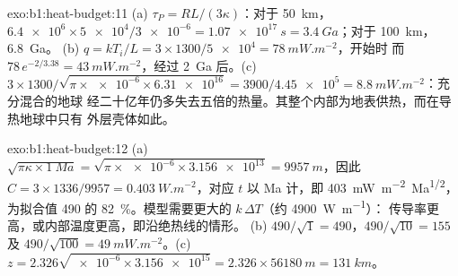 \begin{solution}{exo:b1:heat-budget:11}
(a) $\tau_P = RL/(3\kappa)$：对于 \qty{50}{km}，$\num{6.4e6}\times\num{5e4}/\num{3e-6}
= \qty{1.07e17}{s} = \qty{3.4}{Ga}$；对于 \qty{100}{km}，\qty{6.8}{Ga}。
(b) $q = kT_i/L = 3\times1300/\num{5e4} = \qty{78}{mW.m^{-2}}$，开始时
而 $78\,e^{-2/3.38} = \qty{43}{mW.m^{-2}}$，经过 \qty{2}{Ga} 后。(c)
$3\times1300/\sqrt{\pi\times\num{e-6}\times\num{6.31e16}} = 3900/\num{4.45e5} =
\qty{8.8}{mW.m^{-2}}$：充分混合的地球
经二十亿年仍多失去五倍的热量。其整个内部为地表供热，而在导热地球中只有
外层壳体如此。
\end{solution}

\begin{solution}{exo:b1:heat-budget:12}
(a) $\sqrt{\pi\kappa\times\qty{1}{Ma}} = \sqrt{\pi\times\num{e-6}\times\num{3.156e13}}
= \qty{9957}{m}$，因此 $C = 3\times1336/9957 = \qty{0.403}{W.m^{-2}}$，对应
$t$ 以 Ma 计，即 \qty{403}{mW.m^{-2}.Ma^{1/2}}，为拟合值
490 的 \qty{82}{\percent}。模型需要更大的 $k\,\Delta T$（约 \qty{4900}{W.m^{-1}}）：
传导率更高，或内部温度更高，即沿绝热线的情形。
(b) $490/\sqrt1 = 490$，$490/\sqrt{10} = 155$ 及 $490/\sqrt{100} =
\qty{49}{mW.m^{-2}}$。(c) $z = 2.326\sqrt{\num{e-6}\times\num{3.156e15}} =
2.326\times\qty{56180}{m} = \qty{131}{km}$。
\end{solution}

